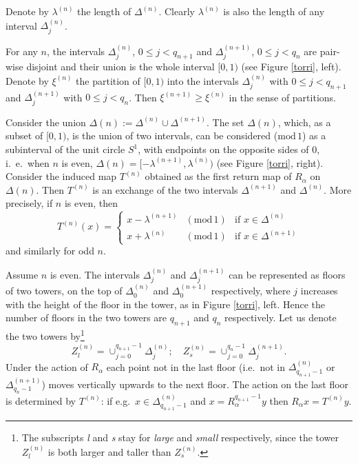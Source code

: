 \documentclass{conm-p-l}
\numberwithin{equation}{section}
\begin{document}
Denote by $\lambda^{(n)}$ the length of $\Delta^{(n)}$. 
Clearly $\lambda^{(n)}$ is also the length of any interval $\Delta^{(n)}_j$.

For any $n$, the intervals $ \Delta^{(n)}_j $, $0\leq j < q_{n+1}$
and $ \Delta^{(n+1)}_j $, $0\leq j < q_{n}$ are pair-wise disjoint and their
union is the whole interval $[0,1)$ (see Figure \ref{torri}, left). Denote by $\xi^{(n)}$ the
partition of $[0,1)$ into the intervals $ \Delta^{(n)}_j $ with $0\leq
j < q_{n+1}$ and $ \Delta^{(n+1)}_j $ with $0\leq j <
q_{n}$.  Then $\xi^{(n+1)}\geq \xi^{(n)}$ in the sense of partitions.  

Consider the union $\Delta(n) := \Delta^{(n)}\cup \Delta^{(n+1)}$.
The set $\Delta(n)$, which, as a subset of $[0,1)$, is the union of
two intervals, can be considered ($\mathrm{mod}\, 1$) as a
subinterval of the unit circle $S^1$, with endpoints on the
opposite sides of $0$, i.~e.~when $n$ is even, $\Delta(n) = [-\lambda^{(n+1)}, \lambda^{(n)})$ (see Figure \ref{torri}, right). Consider the induced map $T^{(n)}$ obtained
as the first return map of $R_{\alpha}$ on  $\Delta(n)$. Then
$T^{(n)}$ is an exchange of the two intervals $\Delta^{(n+1)}$ and
$\Delta^{(n)}$. More precisely, if $n$ is even, then
\begin{equation*}
T^{(n)}(x) = \left\{ \begin{array}{lcl} x - \lambda^{(n+1)} &(\mathrm{mod}\, 1)&
\mathrm{if}\,\, x\in  \Delta^{(n)} \\  x + \lambda^{(n)}  & (\mathrm{mod}\, 1)
& \mathrm{if}\,\,  x\in  \Delta^{(n+1)} \end{array} \right.
\end{equation*}
 and similarly for  odd $n$.

Assume  $n$ is even. The intervals $\Delta^{(n)}_j$ and
$\Delta^{(n+1)}_j$ can be represented as floors of two towers, on the 
top of  $\Delta^{(n)}_0$ and $\Delta^{(n+1)}_0$ respectively,
where $j$ increases with the height of the floor in the tower, as in Figure \ref{torri}, left.
Hence the number of floors in the two towers are $q_{n+1}$ and
$q_n$ respectively. Let us denote the two towers by\footnote{The
subscripts \emph{l} and \emph{s} stay for \emph{large} and
\emph{small} respectively, since the tower $Z^{(n)}_{l}$ is both
larger and taller than $ Z^{(n)}_{s}$.} \begin{equation*} Z^{(n)}_{l} =
\cup_{j=0}^{q_{n+1}-1}\Delta^{(n)}_j ; \quad Z^{(n)}_{s} =
\cup_{j=0}^{q_{n}-1}\Delta^{(n+1)}_j . \end{equation*} Under the action of
$R_{\alpha}$  each point not in the last floor (i.e.~not in
$\Delta^{(n)}_{q_{n+1}-1}$ or $\Delta^{(n+1)}_{q_{n}-1}$) moves
vertically upwards to the next floor. The action on the last floor
is determined by $T^{(n)}$: if e.g.~$x\in
\Delta^{(n)}_{q_{n+1}-1}$ and $x=R_{\alpha}^{q_{n+1}- 1}y$ then 
$R_{\alpha}x = T^{(n)}y$.
\end{document}
